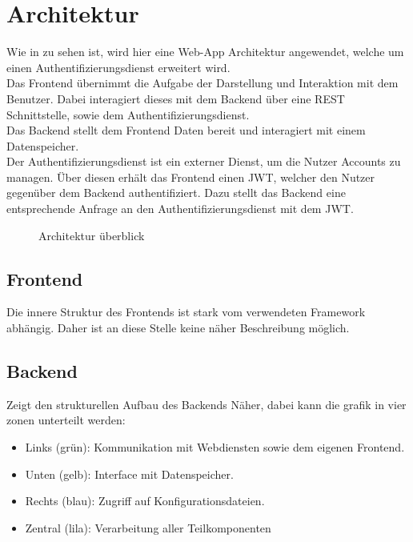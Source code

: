 \chapter{Architektur}\label{ch:architektur}
Wie in  zu sehen ist, wird hier eine Web-App Architektur angewendet,
welche um einen Authentifizierungsdienst erweitert wird.\\
Das Frontend übernimmt die Aufgabe der Darstellung und Interaktion mit dem Benutzer.
Dabei interagiert dieses mit dem Backend über eine \ac{REST} Schnittstelle, sowie dem Authentifizierungsdienst.\\
Das Backend stellt dem Frontend Daten bereit und interagiert mit einem Datenspeicher.\\
Der Authentifizierungsdienst ist ein externer Dienst, um die Nutzer Accounts zu managen.
Über diesen erhält das Frontend einen \ac{JWT}, welcher den Nutzer gegenüber dem Backend authentifiziert.
Dazu stellt das Backend eine entsprechende Anfrage an den Authentifizierungsdienst mit dem \ac{JWT}.

\begin{figure}[h]
    \centering
    
    \caption{Architektur überblick}\label{fig:HighLevelArch}
\end{figure}

\section{Frontend}\label{sec:frontend}

Die innere Struktur des Frontends ist stark vom verwendeten Framework abhängig.
Daher ist an diese Stelle keine näher Beschreibung möglich.

\section{Backend}\label{sec:fokus:-backend}

 Zeigt den strukturellen Aufbau des Backends Näher, dabei kann die grafik in vier zonen unterteilt werden:
\begin{itemize}
    \item Links (grün): Kommunikation mit Webdiensten sowie dem eigenen Frontend.
    \item Unten (gelb): Interface mit Datenspeicher.
    \item Rechts (blau): Zugriff auf Konfigurationsdateien.
    \item Zentral (lila): Verarbeitung aller Teilkomponenten
\end{itemize}

